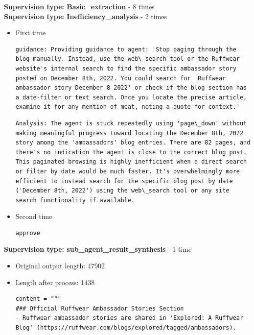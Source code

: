 \begin{tcolorbox}[
        colback=gray!5!white,
        colframe=gray!50!black,
        title=Smolagent + SupervisorAgent,
        floatplacement=Hp,
        breakable  %
    ]
    \textbf{Supervision type: Basic\_extraction} - 8 times\\
    \textbf{Supervision type: Inefficiency\_analysis} - 2 times
    \begin{itemize}[leftmargin=1em]
        \item First time
              \begin{lstlisting}[basicstyle=\ttfamily\small, breaklines=true, columns=fixed, breakindent=0pt, xleftmargin=0pt, gobble=0]
guidance: Providing guidance to agent: 'Stop paging through the blog manually. Instead, use the web\_search tool or the Ruffwear website's internal search to find the specific ambassador story posted on December 8th, 2022. You could search for 'Ruffwear ambassador story December 8 2022' or check if the blog section has a date-filter or text search. Once you locate the precise article, examine it for any mention of meat, noting a quote for context.'
\end{lstlisting}
              \begin{lstlisting}[basicstyle=\ttfamily\small, breaklines=true, columns=fixed, breakindent=0pt, xleftmargin=0pt, gobble=0]
Analysis: The agent is stuck repeatedly using 'page\_down' without making meaningful progress toward locating the December 8th, 2022 story among the 'ambassadors' blog entries. There are 82 pages, and there's no indication the agent is close to the correct blog post. This paginated browsing is highly inefficient when a direct search or filter by date would be much faster. It's overwhelmingly more efficient to instead search for the specific blog post by date ('December 8th, 2022') using the web\_search tool or any site search functionality if available.
\end{lstlisting}
        \item Second time
              \begin{lstlisting}[basicstyle=\ttfamily\small, breaklines=true, columns=fixed, breakindent=0pt, xleftmargin=0pt, gobble=0]
approve
\end{lstlisting}
    \end{itemize}

    \textbf{Supervision type: sub\_agent\_result\_synthesis} - 1 time
    \begin{itemize}[leftmargin=1em]
        \item Original output length: 47902
        \item Length after process: 1438
              \begin{lstlisting}[basicstyle=\ttfamily\small, breaklines=true, columns=fixed, breakindent=0pt, xleftmargin=0pt, gobble=0]
content = """
### Official Ruffwear Ambassador Stories Section
- Ruffwear ambassador stories are shared in 'Explored: A Ruffwear Blog' (https://ruffwear.com/blogs/explored/tagged/ambassadors).


\end{lstlisting}
\end{itemize}
\end{tcolorbox}
